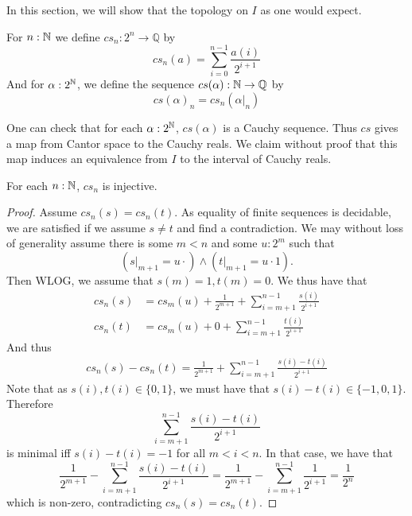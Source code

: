 In this section, we will show that the topology on $I$ as one would expect. 

\begin{definition}
  For $n:\mathbb{N}$ we define 
  $cs_n:2^n \to \mathbb Q$ by 
  \begin{equation}
    cs_n(a) = \sum\limits_{i=0}^{n-1} \frac{a(i)} {2^{i+1}}
  \end{equation}
  And for $\alpha:2^{\mathbb{N}}$, we define the sequence $cs(\alpha) : \mathbb{N} \to \mathbb Q$ by 
  \begin{equation}
    cs(\alpha)_n = cs_n(\alpha|_n)
  \end{equation}
\end{definition}
\begin{remark}
  One can check that for each $\alpha:2^{\mathbb{N}}$, 
  $cs(\alpha)$ is a Cauchy sequence. 
  Thus $cs$ gives a map from Cantor space to the Cauchy reals. 
  We claim without proof that
  this map induces an equivalence from $I$ to the interval of Cauchy reals. 
\end{remark}
\begin{lemma}
  For each $n:\mathbb{N}$, $cs_n$ is injective. 
\end{lemma}  
\begin{proof}
  Assume $cs_n(s) = cs_n(t)$. As equality of finite sequences is decidable, 
  we are satisfied if we assume $s\neq t$ and find a contradiction. 
  We may without loss of generality assume there is some $m<n$ and some $u:2^m$ such that 
  \begin{equation}
    (s|_{m+1} = u \cdot ) \wedge ( t|_{m+1} = u \cdot 1) . 
  \end{equation}
  Then 
  WLOG, we assume that $s(m) = 1, t(m) = 0$. 
  We thus have that 
  \begin{align}
    cs_n(s) &= 
    cs_m(u) + \frac1{2^{m+1}} + \sum\limits_{i = m+1}^{n-1} \frac{s(i)}{2^{i+1}}\\
    cs_n(t) &= 
    cs_m(u) + 0  + \sum\limits_{i = m+1}^{n-1} \frac{t(i)}{2^{i+1}}
  \end{align}
  And thus 
  \begin{align}
    cs_n(s)-cs_n(t) = \frac{1}{2^{m+1}} + \sum\limits_{i = m+1}^{n-1} \frac{s(i)-t(i)}{2^{i+1}}
  \end{align}
  Note that as $s(i),t(i) \in \{0,1\}$, we must have that $s(i) -t(i) \in \{-1,0,1\}$. 
  Therefore 
  $$\sum\limits_{i = m+1}^{n-1} \frac{s(i)-t(i)}{2^{i+1}}$$
  is minimal iff $s(i) -t(i) = -1$ for all $m<i<n$. 
  In that case, we have that 
  $$
  \frac{1}{2^{m+1}}-
  \sum\limits_{i = m+1}^{n-1} \frac{s(i)-t(i)}{2^{i+1}}= 
  \frac{1}{2^{m+1}}-
  \sum\limits_{i = m+1}^{n-1} \frac{1}{2^{i+1}}= 
  \frac{1}{2^n}
  $$
  which is non-zero, contradicting $cs_n(s) = cs_n(t)$. 
\end{proof}

